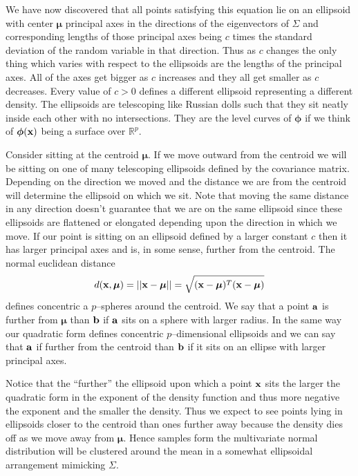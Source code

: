 \documentclass{book}
\newcommand{\bs}[1]{\boldsymbol{#1}}
\begin{document}
We have now discovered that all points satisfying this equation lie on an ellipsoid with center $\bs{\mu}$ principal axes in the directions of the eigenvectors of $\Sigma$ and corresponding lengths of those principal axes being $c$ times the standard deviation of the random variable in that direction. Thus as $c$ changes the only thing which varies with respect to the ellipsoids are the lengths of the principal axes. All of the axes get bigger as $c$ increases and they all get smaller as $c$ decreases. Every value of $c>0$ defines a different ellipsoid representing a different density. The ellipsoids are telescoping like Russian dolls such that they sit neatly inside each other with no intersections. They are the level curves of $\bs{\phi}$ if we think of $\bs{\phi}({\bf x})$ being a surface over $\mathbb{R}^p$.

Consider sitting at the centroid $\bs{\mu}$. If we move outward from the centroid we will be sitting on one of many telescoping ellipsoids defined by the covariance matrix. Depending on the direction we moved and the distance we are from the centroid will determine the ellipsoid on which we sit. Note that moving the same distance in any direction doesn't guarantee that we are on the same ellipsoid since these ellipsoids are flattened or elongated depending upon the direction in which we move. If our point is sitting on an ellipsoid defined by a larger constant $c$ then it has larger principal axes and is, in some sense, further from the centroid. The normal euclidean distance 
$$
d({\bf x},\bs{\mu})=||{\bf x}-\bs{\mu}||=\sqrt{({\bf x}-\bs{\mu})^T({\bf x}-\bs{\mu})}
$$ 
defines concentric a $p$--spheres around the centroid. We say that a point ${\bf a}$ is further from $\bs{\mu}$ than ${\bf b}$ if ${\bf a}$ sits on a sphere with larger radius. In the same way our quadratic form defines concentric $p$--dimensional ellipsoids and we can say that ${\bf a}$ if further from the centroid than ${\bf b}$ if it sits on an ellipse with larger principal axes.

Notice that the ``further'' the ellipsoid upon which a point ${\bf x}$ sits the larger the quadratic form in the exponent of the density function and thus more negative the exponent and the smaller the density. Thus we expect to see points lying in ellipsoids closer to the centroid than ones further away because the density dies off as we move away from $\bs{\mu}$. Hence samples form the multivariate normal distribution will be clustered around the mean in a somewhat ellipsoidal arrangement mimicking $\Sigma$. 
\end{document}
